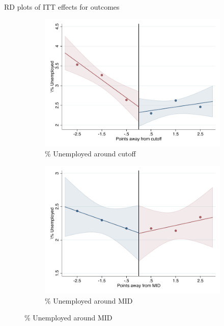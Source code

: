 \documentclass[notes,11pt, aspectratio=169]{beamer}
\begin{document}
\begin{frame}{RD plots of ITT effects for outcomes}
\hyperlink{ITT_rd_plot_IPN}{}
\begin{figure}

    \begin{subfigure}{0.45\textwidth}
        \centering
        \caption{\% Unemployed around cutoff}
        \includegraphics[width=\textwidth]{04_Figures/rd_plot_tau_Unemployed_IPN3.pdf}
    \end{subfigure}
    \begin{subfigure}{0.45\textwidth}
        \centering
        \caption{\% Unemployed around MID}
        \includegraphics[width=\textwidth]{04_Figures/rd_plot_mid_Unemployed_IPN3.pdf}
    \end{subfigure}
    
\end{figure}
\end{frame}
\end{document}
